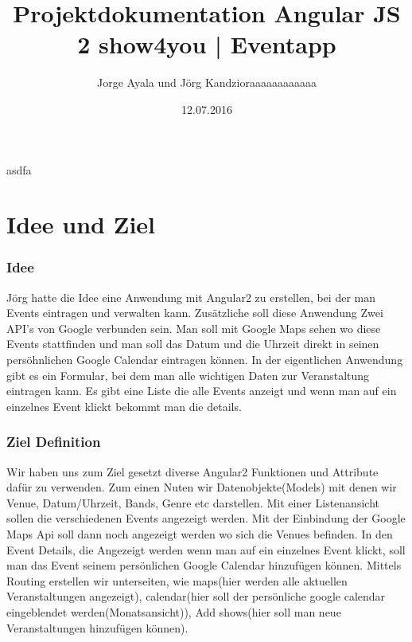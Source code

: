 \documentclass[12pt,titlepage]{article}
\begin{document}
\begin{titlepage}
\title {Projektdokumentation Angular JS 2 \newline show4you | Eventapp}
\date{12.07.2016}
\author{Jorge Ayala und Jörg Kandzioraaaaaaaaaaaa}
\maketitle
\end{titlepage}
\newpage

\tableofcontents

asdfa 
\newpage

\part{Idee und Ziel}
\section{Idee}
Jörg hatte die Idee eine Anwendung mit Angular2 zu erstellen, bei der man Events eintragen und verwalten kann. Zusätzliche soll diese Anwendung Zwei API's von Google verbunden sein. Man soll mit Google Maps sehen wo diese Events stattfinden und man soll das Datum und die Uhrzeit direkt in seinen persöhnlichen Google Calendar eintragen können. In der eigentlichen Anwendung gibt es ein Formular, bei dem man alle wichtigen Daten zur Veranstaltung eintragen kann. Es gibt eine Liste die alle Events anzeigt und wenn man auf ein einzelnes Event klickt bekommt man die details.

\section{Ziel Definition}
Wir haben uns zum Ziel gesetzt diverse Angular2 Funktionen und Attribute dafür zu verwenden. Zum einen Nuten wir Datenobjekte(Models) mit denen wir Venue, Datum/Uhrzeit, Bands, Genre etc darstellen. Mit einer Listenansicht sollen die verschiedenen Events angezeigt werden. Mit der Einbindung der Google Maps Api soll dann noch angezeigt werden wo sich die Venues befinden. In den Event Details, die Angezeigt werden wenn man auf ein einzelnes Event klickt, soll man das Event seinem persönlichen Google Calendar hinzufügen können. Mittels Routing erstellen wir unterseiten, wie maps(hier werden alle aktuellen Veranstaltungen angezeigt), calendar(hier soll der persönliche google calendar eingeblendet werden(Monatsansicht)), Add shows(hier soll man neue Veranstaltungen hinzufügen können).
\end{document}
